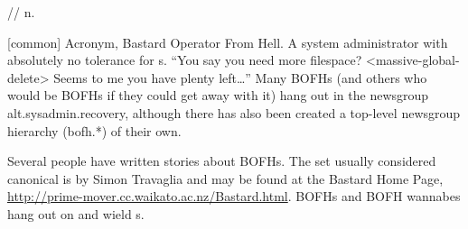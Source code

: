  // n.

[common] Acronym, Bastard Operator From Hell. A system administrator with
absolutely no tolerance for s. ``You say you need more
filespace? <massive-global-delete> Seems to me you have plenty left\dots'' Many
BOFHs (and others who would be BOFHs if they could get away with it) hang out in
the newsgroup alt.sysadmin.recovery, although there has also been created a
top-level newsgroup hierarchy (bofh.*) of their own.

Several people have written stories about BOFHs. The set usually considered
canonical is by Simon Travaglia and may be found at the Bastard Home Page,
\url{http://prime-mover.cc.waikato.ac.nz/Bastard.html}. BOFHs and BOFH wannabes
hang out on  and wield s.

